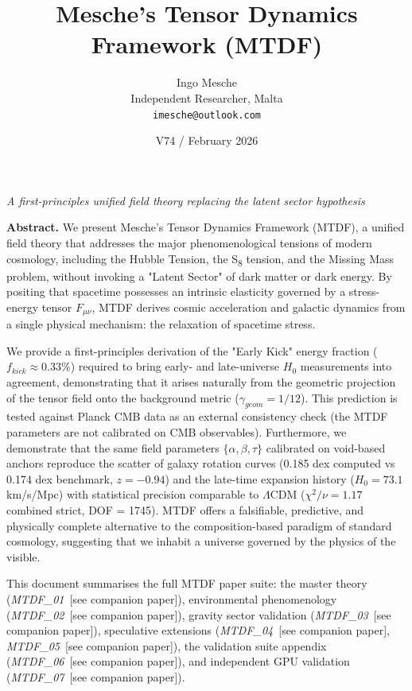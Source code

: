 \documentclass[11pt,a4paper]{article}
\title{Mesche's Tensor Dynamics Framework (MTDF)}
\author{Ingo Mesche\\ \small Independent Researcher, Malta \\ \small \texttt{imesche@outlook.com}}
\date{V74 / February 2026}
\begin{document}
\maketitle
\begin{center}\itshape A first-principles unified field theory replacing the latent sector hypothesis\end{center}



\begin{mdframed}[linecolor=accent,linewidth=0.5pt,backgroundcolor=callout-bg,leftline=true,rightline=true,topline=true,bottomline=true,innerleftmargin=8pt,innerrightmargin=8pt,innertopmargin=6pt,innerbottommargin=6pt]
\textbf{Abstract.} We present Mesche's Tensor Dynamics Framework (MTDF), a unified field theory that addresses the major phenomenological tensions of modern cosmology, including the Hubble Tension, the S\textsubscript{8} tension, and the Missing Mass problem, without invoking a "Latent Sector" of dark matter or dark energy. By positing that spacetime possesses an intrinsic elasticity governed by a stress-energy tensor $F_{\mu\nu}$, MTDF derives cosmic acceleration and galactic dynamics from a single physical mechanism: the relaxation of spacetime stress.

We provide a first-principles derivation of the "Early Kick" energy fraction ($f_{kick} \approx 0.33\%$) required to bring early- and late-universe $H_0$ measurements into agreement, demonstrating that it arises naturally from the geometric projection of the tensor field onto the background metric ($\gamma_{geom}=1/12$). This prediction is tested against Planck CMB data as an external consistency check (the MTDF parameters are not calibrated on CMB observables). Furthermore, we demonstrate that the same field parameters $\{\alpha, \beta, \tau\}$ calibrated on void-based anchors reproduce the scatter of galaxy rotation curves (0.185 dex computed vs 0.174 dex benchmark, $z = -0.94$) and the late-time expansion history ($H_0 = 73.1$ km/\allowbreak{}s/\allowbreak{}Mpc) with statistical precision comparable to $\Lambda$CDM ($\chi^2/\nu = 1.17$ combined strict, DOF = 1745). MTDF offers a falsifiable, predictive, and physically complete alternative to the composition-based paradigm of standard cosmology, suggesting that we inhabit a universe governed by the physics of the visible.

This document summarises the full MTDF paper suite: the master theory (\textit{MTDF\_\allowbreak{}01}~[see companion paper]), environmental phenomenology (\textit{MTDF\_\allowbreak{}02}~[see companion paper]), gravity sector validation (\textit{MTDF\_\allowbreak{}03}~[see companion paper]), speculative extensions (\textit{MTDF\_\allowbreak{}04}~[see companion paper], \textit{MTDF\_\allowbreak{}05}~[see companion paper]), the validation suite appendix (\textit{MTDF\_\allowbreak{}06}~[see companion paper]), and independent GPU validation (\textit{MTDF\_\allowbreak{}07}~[see companion paper]).
\end{mdframed}
\end{document}
